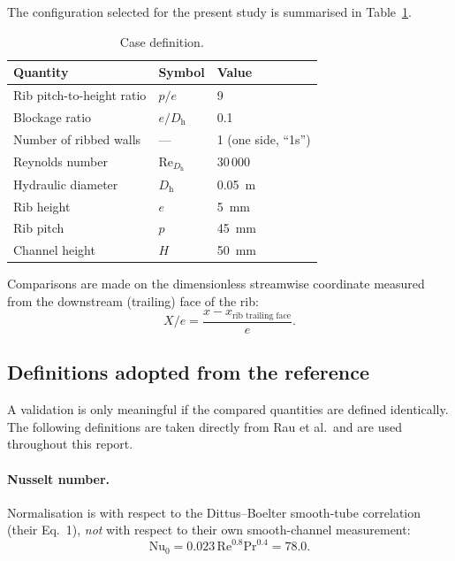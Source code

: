 \documentclass[11pt,a4paper]{article}
\newcommand{\Dh}{D_{\mathrm{h}}}
\newcommand{\Rey}{\mathrm{Re}}
\newcommand{\Prl}{\mathrm{Pr}}
\newcommand{\Nuss}{\mathrm{Nu}}
\begin{document}
The configuration selected for the present study is summarised in
Table~\ref{tab:case}.

\begin{table}[htbp]
\centering
\caption{Case definition.}
\label{tab:case}
\begin{tabular}{lll}
\toprule
Quantity & Symbol & Value \\
\midrule
Rib pitch-to-height ratio & $p/e$        & 9 \\
Blockage ratio            & $e/\Dh$      & 0.1 \\
Number of ribbed walls    & ---          & 1 (one side, ``1s'') \\
Reynolds number           & $\Rey_{\Dh}$ & 30\,000 \\
Hydraulic diameter        & $\Dh$        & \SI{0.05}{\meter} \\
Rib height                & $e$          & \SI{5}{\milli\meter} \\
Rib pitch                 & $p$          & \SI{45}{\milli\meter} \\
Channel height            & $H$          & \SI{50}{\milli\meter} \\
\bottomrule
\end{tabular}
\end{table}

Comparisons are made on the dimensionless streamwise coordinate measured
from the downstream (trailing) face of the rib:
\begin{equation}
  X/e = \frac{x - x_{\text{rib trailing face}}}{e}.
  \label{eq:xe}
\end{equation}

\subsection{Definitions adopted from the reference}
\label{sec:defs}

A validation is only meaningful if the compared quantities are defined
identically. The following definitions are taken directly from
Rau et al.\ and are used throughout this report.

\paragraph{Nusselt number.} Normalisation is with respect to the
Dittus--Boelter smooth-tube correlation (their Eq.~1), \emph{not} with
respect to their own smooth-channel measurement:
\begin{equation}
  \Nuss_{0} = 0.023\,\Rey^{0.8}\Prl^{0.4} = 78.0 .
  \label{eq:nu0}
\end{equation}
\end{document}
